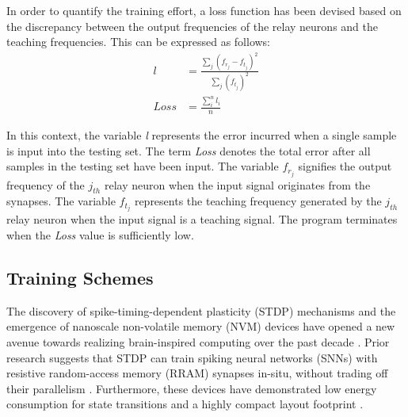 \noindent In order to quantify the training effort, a loss function has been devised based on the discrepancy between the output frequencies of the relay neurons and the teaching frequencies. This can be expressed as follows:
\begin{align}
l &= \frac{\sum_{j}^{}\left( f_{r_j} - f_{t_j} \right)^2}{\sum_{j}^{}\left( f_{t_j} \right)^2} \label{eq:6.16}\\
Loss &= \frac{\sum_{i}^{n}l_i}{n} \label{eq:6.17}
\end{align}

\noindent In this context, the variable \textit{l} represents the error incurred when a single sample is input into the testing set. The term \textit{Loss} denotes the total error after all samples in the testing set have been input. The variable $f_{r_j}$ signifies the output frequency of the $j_{th}$ relay neuron when the input signal originates from the synapses. The variable $f_{t_j}$ represents the teaching frequency generated by the $j_{th}$ relay neuron when the input signal is a teaching signal. The program terminates when the \textit{Loss} value is sufficiently low.

\subsection[Training Schemes]{Training Schemes}


\noindent The discovery of spike-timing-dependent plasticity (STDP) mechanisms and the emergence of nanoscale non-volatile memory (NVM) devices have opened a new avenue towards realizing brain-inspired computing over the past decade \cite{zamarreno2011spike}. Prior research suggests that STDP can train spiking neural networks (SNNs) with resistive random-access memory (RRAM) synapses in-situ, without trading off their parallelism \cite{querlioz2012bioinspired}. Furthermore, these devices have demonstrated low energy consumption for state transitions and a highly compact layout footprint \cite{yu2011electronic}.\\

